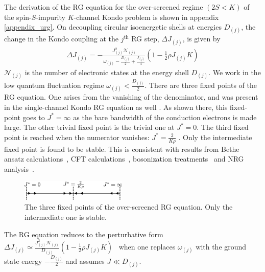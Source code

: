 \documentclass[reprint,prb,superscriptaddress]{revtex4-2}
\begin{document}
The derivation of the RG equation for the over-screened regime \((2S < K)\) of the spin-\(S\)-impurity \(K\)-channel Kondo problem is shown in appendix \ref{appendix_urg}. On decoupling circular isoenergetic shells at energies \(D_{(j)}\), the change in the Kondo coupling at the \(j^\text{th}\) RG step, \(\Delta J_{(j)}\), is given by
\begin{equation}\begin{aligned}
	\Delta J_{(j)} = -\frac{J_{(j)}^2 \mathcal{N}_{(j)}}{\omega_{(j)} - \frac{D_{(j)}}{2} + \frac{J_{(j)}}{4}}\left( 1 - \frac{1}{2}\rho J_{(j)} K \right) 
\end{aligned}\end{equation}
\(\mathcal{N}_{(j)}\) is the number of electronic states at the energy shell \(D_{(j)}\). We work in the low quantum fluctuation regime \(\omega_{(j)} < \frac{D_{(j)}}{2}\). There are three fixed points of the RG equation. One arises from the vanishing of the denominator, and was present in the single-channel Kondo RG equation as well \cite{kondo_urg}. As shown there, this fixed-point goes to \(J^* = \infty\) as the bare bandwidth of the conduction electrons is made large. The other trivial fixed point is the trivial one at \(J^* = 0\). The third fixed point is reached when the numerator vanishes: \(J^* = \frac{2}{K \rho}\) \cite{Gan_mchannel_1994,Kogan_2018,Kuramoto1998,Noz_blandin_1980}. Only the intermediate fixed point is found to be stable. This is consistent with results from Bethe ansatz calculations~\cite{Tsvelick_Weigmann_mchannel_1984,andrei_destri_1984,zarand_costi_2002,andrei_jerez_1995,Tsvelick_1985,Tsvelick1984}, CFT calculations~\cite{affleck_1991_overscreen,affleck1993exact,affleck_ludwig_1991}, bosonization treatments~\cite{emery_kivelson,vondelft_prl_1998} and NRG analysis~\cite{pang_cox_1991,mitchell_bulla_2014}.
\begin{figure}[!htpb]
	\centering
	\includegraphics[width=0.45\textwidth]{./rg_flow.pdf}
	\caption{The three fixed points of the over-screened RG equation. Only the intermediate one is stable.}
	\label{rg_flow}
\end{figure}

The RG equation reduces to the perturbative form \(\Delta J_{(j)} \simeq \frac{J_{(j)}^2 \mathcal{N}_{(j)}}{D_{(j)}}\left( 1 - \frac{1}{2}\rho J_{(j)} K \right)\)~\cite{Kogan_2018,Kuramoto1998,Noz_blandin_1980,tripathi2018landau} when one replaces \(\omega_{(j)}\) with the ground state energy \(-\frac{D_{(j)}}{2}\) and assumes \(J \ll D_{(j)}\).
\end{document}

